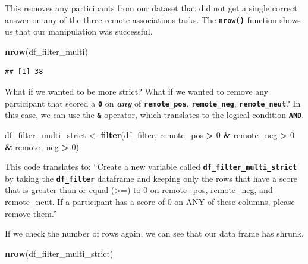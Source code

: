 \documentclass[
]{book}
\newenvironment{Shaded}{\begin{snugshade}}{\end{snugshade}}
\newcommand{\DecValTok}[1]{\textcolor[rgb]{0.00,0.00,0.81}{#1}}
\newcommand{\FunctionTok}[1]{\textcolor[rgb]{0.13,0.29,0.53}{\textbf{#1}}}
\newcommand{\NormalTok}[1]{#1}
\newcommand{\OtherTok}[1]{\textcolor[rgb]{0.56,0.35,0.01}{#1}}
\newcommand{\SpecialCharTok}[1]{\textcolor[rgb]{0.81,0.36,0.00}{\textbf{#1}}}
\begin{document}
This removes any participants from our dataset that did not get a single correct answer on any of the three remote associations tasks. The \textbf{\texttt{nrow()}} function shows us that our manipulation was successful.

\begin{Shaded}
\begin{Highlighting}[]
\FunctionTok{nrow}\NormalTok{(df\_filter\_multi)}
\end{Highlighting}
\end{Shaded}

\begin{verbatim}
## [1] 38
\end{verbatim}

What if we wanted to be more strict? What if we wanted to remove any participant that scored a \textbf{\texttt{0}} on \textbf{\emph{any}} of \textbf{\texttt{remote\_pos}}, \textbf{\texttt{remote\_neg}}, \textbf{\texttt{remote\_neut}}? In this case, we can use the \textbf{\texttt{\&}} operator, which translates to the logical condition \textbf{\texttt{AND}}.

\begin{Shaded}
\begin{Highlighting}[]
\NormalTok{df\_filter\_multi\_strict }\OtherTok{\textless{}{-}} \FunctionTok{filter}\NormalTok{(df\_filter, remote\_pos }\SpecialCharTok{\textgreater{}} \DecValTok{0} \SpecialCharTok{\&}\NormalTok{ remote\_neg }\SpecialCharTok{\textgreater{}} \DecValTok{0} \SpecialCharTok{\&}\NormalTok{ remote\_neg }\SpecialCharTok{\textgreater{}} \DecValTok{0}\NormalTok{)}
\end{Highlighting}
\end{Shaded}

This code translates to: ``Create a new variable called \textbf{\texttt{df\_filter\_multi\_strict}} by taking the \textbf{\texttt{df\_filter}} dataframe and keeping only the rows that have a score that is greater than or equal (\textgreater=) to 0 on remote\_pos, remote\_neg, and remote\_neut. If a participant has a score of 0 on ANY of these columns, please remove them.''

If we check the number of rows again, we can see that our data frame has shrunk.

\begin{Shaded}
\begin{Highlighting}[]
\FunctionTok{nrow}\NormalTok{(df\_filter\_multi\_strict)}
\end{Highlighting}
\end{Shaded}
\end{document}
